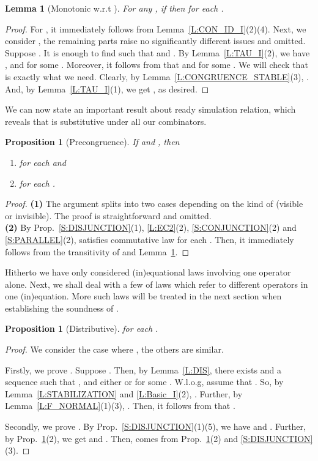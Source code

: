 \documentclass{elsarticle}
\theoremstyle{plain}
\newtheorem{lemma}[theorem]{Lemma}
\newtheorem{proposition}[theorem]{Proposition}
\theoremstyle{definition}
\begin{document}
\begin{lemma}[Monotonic w.r.t ]\label{L:CONGRUENCE_PRE}
For any , if  then  for each .
\end{lemma}
\begin{proof}
  For , it immediately follows from Lemma~\ref{L:CON_ID_I}(2)(4).
  Next, we consider , the remaining parts raise no significantly different issues and omitted.
    Suppose  .
    It is enough to find  such that  and .
    By Lemma~\ref{L:TAU_I}(2), we have ,  and  for some .
     Moreover, it follows from  that  and  for some .
    We will check that  is exactly what we need.
    Clearly, by Lemma~\ref{L:CONGRUENCE_STABLE}(3), .
    And, by Lemma~\ref{L:TAU_I}(1), we get , as desired.
\end{proof}

We can now state an important result about ready simulation relation, which reveals that  is substitutive under all our combinators.

\begin{proposition}[Precongruence]\label{L:CONGRUENCE}
  If  and , then
  \begin{enumerate}
    \item    for each  and
    \item  for each .
  \end{enumerate}
\end{proposition}
\begin{proof}
\noindent \textbf{(1)} The argument splits into two cases depending on the kind of  (visible or invisible). The proof is straightforward and omitted.
\\

\noindent \textbf{(2)} By Prop.~\ref{S:DISJUNCTION}(1), \ref{L:EC2}(2), \ref{S:CONJUNCTION}(2)  and \ref{S:PARALLEL}(2),  satisfies commutative law for each .
Then, it immediately follows from the transitivity of  and Lemma~\ref{L:CONGRUENCE_PRE}.
\end{proof}

Hitherto we have only considered (in)equational laws involving one operator alone.
Next, we shall deal with a few of laws which refer to different operators in one (in)equation.
More such laws will be treated in the next section when establishing the soundness of .

\begin{proposition}[Distributive]\label{S:DISTRIBUTIVE}
        for each  .
\end{proposition}
\begin{proof}
    We consider the case where , the others are similar.

    Firstly, we prove .
    Suppose .
    Then, by Lemma~\ref{L:DIS}, there exists  and a sequence  such that ,  and either  or  for some .
    W.l.o.g, assume that .
    So, by Lemma~\ref{L:STABILIZATION} and \ref{L:Basic_I}(2), .
    Further, by Lemma~\ref{L:F_NORMAL}(1)(3), .
    Then, it follows from  that .

    Secondly, we prove .
    By Prop.~\ref{S:DISJUNCTION}(1)(5), we have   and .
    Further, by Prop.~\ref{L:CONGRUENCE}(2), we get  and . Then,  comes from Prop.~\ref{L:CONGRUENCE}(2) and \ref{S:DISJUNCTION}(3).
\end{proof}
\end{document}
